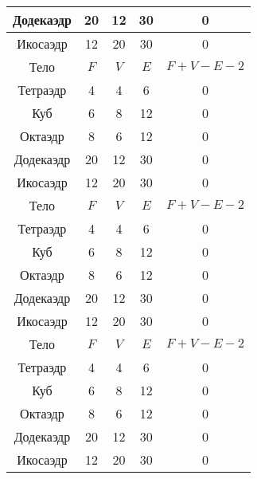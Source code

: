 \begin{longtable}[H]{|c|c|c|c|c|}
    Додекаэдр & 20  & 12   & 30  & 0         \\ \hline
    Икосаэдр  & 12  & 20   & 30  & 0         \\ \hline
    Тело      & $F$ & $V$  & $E$ & $F+V-E-2$ \\ \hline
    Тетраэдр  & 4   & 4    & 6   & 0         \\ \hhline{~-~-~}
    Куб       & 6   & 8    & 12  & 0         \\ \hhline{--~~~}
    Октаэдр   & 8   & 6    & 12  & 0         \\ \hhline{-----}
    Додекаэдр & 20  & 12   & 30  & 0         \\ \hline
    Икосаэдр  & 12  & 20   & 30  & 0         \\ \hline
    Тело      & $F$ & $V$  & $E$ & $F+V-E-2$ \\ \hline
    Тетраэдр  & 4   & 4    & 6   & 0         \\ \hhline{~-~-~}
    Куб       & 6   & 8    & 12  & 0         \\ \hhline{--~~~}
    Октаэдр   & 8   & 6    & 12  & 0         \\ \hhline{-----}
    Додекаэдр & 20  & 12   & 30  & 0         \\ \hline
    Икосаэдр  & 12  & 20   & 30  & 0         \\ \hline
    Тело      & $F$ & $V$  & $E$ & $F+V-E-2$ \\ \hline
    Тетраэдр  & 4   & 4    & 6   & 0         \\ \hhline{~-~-~}
    Куб       & 6   & 8    & 12  & 0         \\ \hhline{--~~~}
    Октаэдр   & 8   & 6    & 12  & 0         \\ \hhline{-----}
    Додекаэдр & 20  & 12   & 30  & 0         \\ \hline
    Икосаэдр  & 12  & 20   & 30  & 0         \\ \hline
\end{longtable}